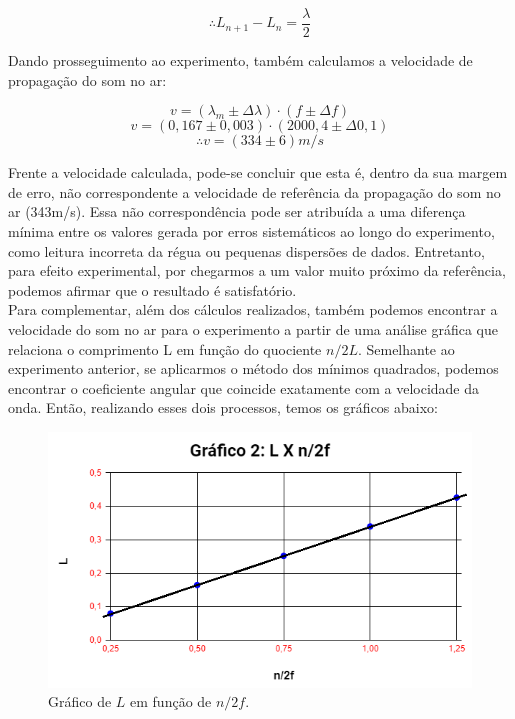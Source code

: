 \[ \therefore L_{n+1} - L_n = \frac{\lambda}{2} \]

Dando prosseguimento ao experimento, também calculamos a velocidade de propagação do som no ar:

\[ v = (\lambda_m \pm \Delta\lambda) \cdot (f \pm \Delta f)\]
\[ v = (0,167 \pm 0,003) \cdot (2000,4 \pm \Delta 0,1)\]
\[ \therefore v = (334 \pm 6) m/s\]

Frente a velocidade calculada, pode-se concluir que esta é, dentro da sua margem de erro, não correspondente a velocidade de referência da propagação do som no ar (343m/s). Essa não correspondência pode ser atribuída a uma diferença mínima entre os valores gerada por erros sistemáticos ao longo do experimento, como leitura incorreta da régua ou pequenas dispersões de dados. Entretanto, para efeito experimental, por chegarmos a um valor muito próximo da referência, podemos afirmar que o resultado é satisfatório.\\

Para complementar, além dos cálculos realizados, também podemos encontrar a velocidade do som no ar para o experimento a partir de uma análise gráfica que relaciona o comprimento L em função do quociente $n/2L$. Semelhante ao experimento anterior, se aplicarmos o método dos mínimos quadrados, podemos encontrar o coeficiente angular que coincide exatamente com a velocidade da onda. Então, realizando esses dois processos, temos os gráficos abaixo:

\begin{figure}[H]
  \centering
  \includegraphics[scale=0.8]{images/Gráfico 2.png}
  \caption{ Gráfico de $L$ em função de $n/2f$.}
\end{figure}


